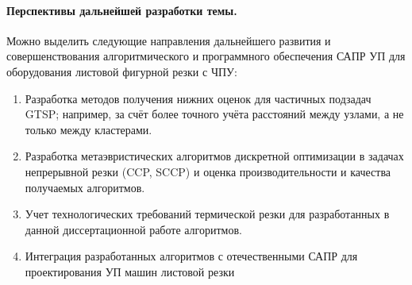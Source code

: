 \paragraph*{Перспективы дальнейшей разработки темы.}
Можно выделить следующие направления дальнейшего развития и совершенствования алгоритмического и
программного обеспечения САПР УП для оборудования листовой фигурной резки с ЧПУ:

\begin{enumerate}
    \item
    Разработка методов получения нижних оценок для частичных подзадач GTSP;
    например, за счёт более точного учёта расстояний между узлами,
    а не только между кластерами.
    \item
    Разработка метаэвристических алгоритмов дискретной оптимизации в задачах
    непрерывной резки
    (CCP, SCCP)
    и оценка производительности и качества получаемых
    алгоритмов.
    \item
    Учет технологических требований термической резки
    для разработанных в данной диссертационной работе алгоритмов.
    \item
    Интеграция разработанных алгоритмов с отечественными САПР
    для проектирования УП машин листовой резки
\end{enumerate}

